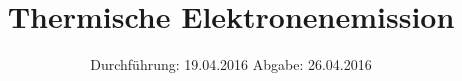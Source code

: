 
\subject{504}
\title{Thermische Elektronenemission}
\date{
  Durchführung: 19.04.2016
  \hspace{3em}
  Abgabe: 26.04.2016
}



\maketitle
\newpage
\mbox{}
\newpage
\thispagestyle{empty}
\tableofcontents
\newpage






\printbibliography


